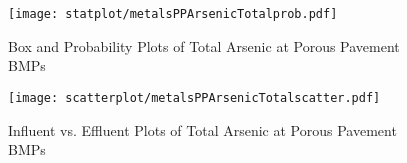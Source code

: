         \begin{figure}[hb]   %
            \centering
            \texttt{[image: statplot/metalsPPArsenicTotalprob.pdf]}
            \caption{Box and Probability Plots of Total Arsenic at Porous Pavement BMPs}
        \end{figure}         %
        
        
        \begin{figure}[hb]   %
            \centering
            \texttt{[image: scatterplot/metalsPPArsenicTotalscatter.pdf]}
            \caption{Influent vs. Effluent Plots of Total Arsenic at Porous Pavement BMPs}
        \end{figure}         %
        \clearpage
        